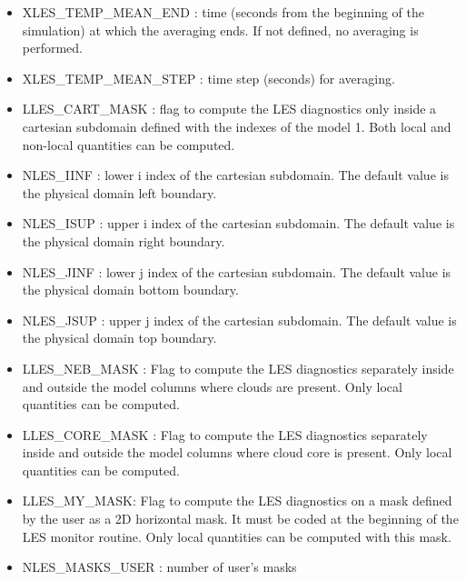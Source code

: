 \begin{itemize}
\item
XLES\_TEMP\_MEAN\_END  : time (seconds from the beginning of the simulation)
at which the averaging ends. If not defined, no averaging is performed.

\item
XLES\_TEMP\_MEAN\_STEP  : time step (seconds) for averaging.                     

\item
LLES\_CART\_MASK   : flag to compute the LES diagnostics
only inside a cartesian subdomain defined with the indexes of the model 1. Both local and non-local
quantities can be computed.

\item
NLES\_IINF  : lower i index of the cartesian subdomain. The default value is the 
physical domain left boundary.

\item
NLES\_ISUP  : upper i index of the cartesian subdomain. The default value is the 
physical domain right  boundary.

\item
NLES\_JINF  : lower j index of the cartesian subdomain. The default value is the
physical domain bottom boundary.

\item
NLES\_JSUP : upper j index of the cartesian subdomain. The default value is the
physical domain top boundary.

\item
LLES\_NEB\_MASK  : Flag to compute the LES diagnostics
separately inside and outside  the model columns where clouds
are present. Only local
quantities can be computed.

\item
LLES\_CORE\_MASK  : Flag to compute the LES diagnostics
separately inside and outside  the model columns where cloud core is present.
Only local quantities can be computed.

\item
LLES\_MY\_MASK: Flag to compute the LES diagnostics
on a mask defined by the user as a 2D horizontal mask.
It must be coded at the
beginning of the LES monitor routine. Only local quantities can be computed
with this mask.
\item
NLES\_MASKS\_USER  : number of user's masks

\end{itemize}


